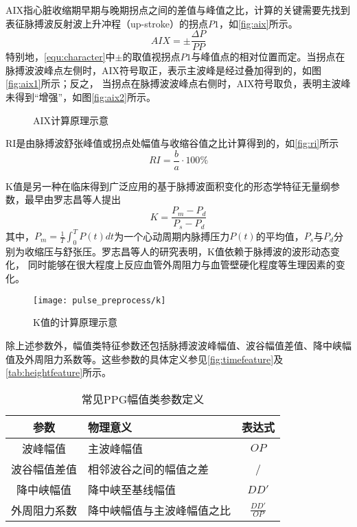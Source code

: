 AIX指心脏收缩期早期与晚期拐点之间的差值与峰值之比，计算的关键需要先找到表征脉搏波反射波上升冲程（up-stroke）的拐点$P1$，如\autoref{fig:aix}所示\cite{Su2014}。
\begin{equation}
    \label{equ:aix}
    AIX = \pm \frac{\Delta P}{PP}
\end{equation}
特别地，\autoref{equ:character}中$\pm$的取值视拐点$P1$与峰值点的相对位置而定。当拐点在脉搏波波峰点左侧时，AIX符号取正，表示主波峰是经过叠加得到的，如图\autoref{fig:aix1}所示；反之，
当拐点在脉搏波波峰点右侧时，AIX符号取负，表明主波峰未得到“增强”，如图\autoref{fig:aix2}所示。
\begin{figure}[htbp]
    \centering
    \quad
    \caption[AIX计算原理示意]{\label{fig:aix}AIX计算原理示意\cite{Su2014}}
\end{figure}

RI是由脉搏波舒张峰值或拐点处幅值与收缩谷值之比计算得到的，如\autoref{fig:ri}所示\cite{Su2014,Elgendi2012}
\begin{equation}
    \label{equ:ri}
    RI = \frac{b}{a} \cdot 100\%
\end{equation}

K值是另一种在临床得到广泛应用的基于脉搏波面积变化的形态学特征无量纲参数，最早由罗志昌等人提出\cite{Luo1988,PPGYY}
\begin{equation}
    \label{equ:ppgk}
    K=\frac{P_m-P_d}{P_s-P_d}
\end{equation}
其中，$P_m=\frac{1}{T}\int_{0}^{T}P(t)dt$为一个心动周期内脉搏压力$P(t)$的平均值，$P_s$与$P_d$分别为收缩压与舒张压。罗志昌等人的研究表明，K值依赖于脉搏波的波形动态变化，
同时能够在很大程度上反应血管外周阻力与血管壁硬化程度等生理因素的变化。
\begin{figure}[htbp]
    \centering
    \texttt{[image: pulse\_preprocess/k]}
    \caption{\label{fig:k}K值的计算原理示意}
\end{figure}

除上述参数外，幅值类特征参数还包括脉搏波波峰幅值、波谷幅值差值、降中峡幅值及外周阻力系数等\cite{cwl,mmt}。这些参数的具体定义参见\autoref{fig:timefeature}及\autoref{tab:heightfeature}所示。
\begin{table}[htbp]
    \centering
    \caption{\label{tab:heightfeature}常见PPG幅值类参数定义}
    \begin{tabularx}{\linewidth}{cX<{\centering}c}
    \toprule
    \textbf{参数} & \textbf{物理意义} & \textbf{表达式} \\
    \midrule
    波峰幅值      &  主波峰幅值         &  $OP$\\
    波谷幅值差值      &  相邻波谷之间的幅值之差         &  /\\
    降中峡幅值      &  降中峡至基线幅值         &  $DD'$\\
    外周阻力系数      &  降中峡幅值与主波峰幅值之比         &  $\frac{DD'}{OP}$\\
    \bottomrule
    \end{tabularx}
\end{table}

